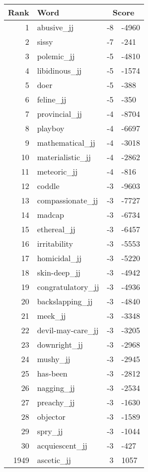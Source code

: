 \begin{longtable}[!htbp]{| rlr@{.}l |}
    \hline
    \textbf{Rank} & \textbf{Word} & \multicolumn{2}{c|}{\textbf{Score}} \\
    \hline
    \endhead
    1 & abusive\_jj & -8 & -4960 \\
    2 & sissy & -7 & -241 \\
    3 & polemic\_jj & -5 & -4810 \\
    4 & libidinous\_jj & -5 & -1574 \\
    5 & doer & -5 & -388 \\
    6 & feline\_jj & -5 & -350 \\
    7 & provincial\_jj & -4 & -8704 \\
    8 & playboy & -4 & -6697 \\
    9 & mathematical\_jj & -4 & -3018 \\
    10 & materialistic\_jj & -4 & -2862 \\
    11 & meteoric\_jj & -4 & -816 \\
    12 & coddle & -3 & -9603 \\
    13 & compassionate\_jj & -3 & -7727 \\
    14 & madcap & -3 & -6734 \\
    15 & ethereal\_jj & -3 & -6457 \\
    16 & irritability & -3 & -5553 \\
    17 & homicidal\_jj & -3 & -5220 \\
    18 & skin-deep\_jj & -3 & -4942 \\
    19 & congratulatory\_jj & -3 & -4936 \\
    20 & backslapping\_jj & -3 & -4840 \\
    21 & meek\_jj & -3 & -3348 \\
    22 & devil-may-care\_jj & -3 & -3205 \\
    23 & downright\_jj & -3 & -2968 \\
    24 & mushy\_jj & -3 & -2945 \\
    25 & has-been & -3 & -2812 \\
    26 & nagging\_jj & -3 & -2534 \\
    27 & preachy\_jj & -3 & -1630 \\
    28 & objector & -3 & -1589 \\
    29 & spry\_jj & -3 & -1044 \\
    30 & acquiescent\_jj & -3 & -427 \\
    1949 & ascetic\_jj & 3 & 1057 \\

\end{longtable}
